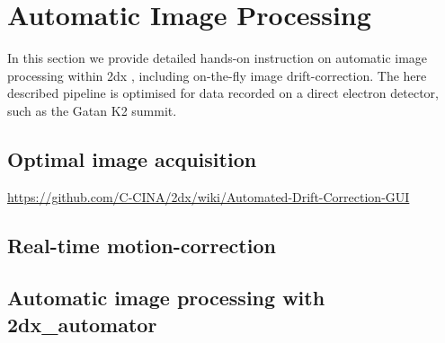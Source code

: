 \section{Automatic Image Processing}

In this section we provide detailed hands-on instruction on automatic image processing within 2dx \cite{scherer20142dx_automator}, including on-the-fly image drift-correction. The here described pipeline is optimised for data recorded on a direct electron detector, such as the Gatan K2 summit. 

\subsection{Optimal image acquisition}

\url{https://github.com/C-CINA/2dx/wiki/Automated-Drift-Correction-GUI}

\subsection{Real-time motion-correction}

\subsection{Automatic image processing with 2dx\_automator}
